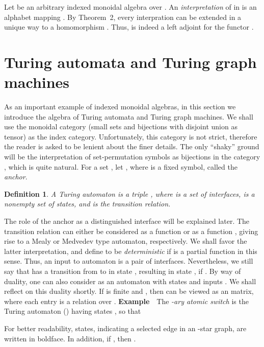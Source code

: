 \documentclass{eptcs}
\newtheorem{definition}{Definition}
\begin{document}
Let  be an arbitrary indexed monoidal algebra over . An {\em interpretation\/}
of  in  is an alphabet mapping .
By Theorem~2, every interpration  can be extended in a unique way to a 
homomorphism . Thus,  is indeed a
left adjoint for the functor .
\section{Turing automata and Turing graph machines}
As an important example of indexed monoidal algebras, in this section we introduce the
algebra of Turing automata and Turing graph machines. We shall use the monoidal 
category  (small sets and bijections with disjoint union as tensor) as the
index category. Unfortunately, this category is not
strict, therefore the reader is asked to be lenient about the finer details. The only
``shaky'' ground will be the interpretation of set-permutation symbols as bijections
in the category , which is quite natural.
For a set , let ,
where  is a fixed symbol, called the {\em anchor}. 
\vspmini
\begin{definition}
{\em A {\em Turing automaton\/}  is a triple , where  is a set of
{\em interfaces},  is a nonempty set of {\em states}, and 
is the {\em transition relation}.}\vspmini
\end{definition}


The role of the anchor as a distinguished interface will be explained later.
The transition relation  can either be considered as a function
 or as a function , giving rise to a Mealy or Medvedev type automaton,
respectively. We shall favor the latter interpretation, and define  to be
{\em deterministic\/} if  is a partial function in this sense. Thus,
an input to automaton  is a pair  of interfaces. Nevertheless, we
still say that  has a transition from  to  in state , resulting in
state , if . By way of duality, one can also
consider  as an automaton with states  and inputs . We
shall reflect on this duality shortly. If  is finite and , then
 can be viewed as an  matrix, where each entry is a
relation over . 
\vspp \newline 
{\bf Example}\ \ The
{\em -ary atomic switch\/} is the Turing automaton  () 
having states , so that  
\vspmmm


For better readability, states, indicating a selected edge in an -star graph,
 are written in boldface. In addition, if , then
. 
\end{document}

